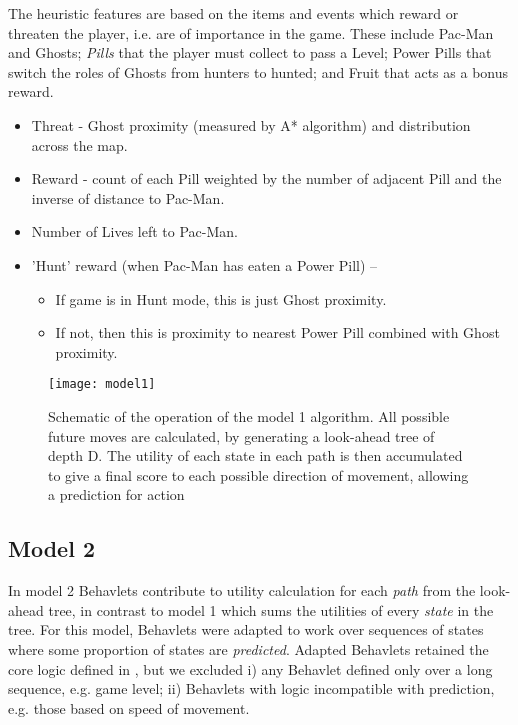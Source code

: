 \documentclass[conference]{IEEEtran}
\begin{document}
The heuristic features are based on the items and events which reward or threaten the player, i.e. are of importance in the game. These include Pac-Man and Ghosts; \textit{Pills} that the player must collect to pass a Level; Power Pills that switch the roles of Ghosts from hunters to hunted; and Fruit that acts as a bonus reward.

\begin{itemize}
	\item Threat - Ghost proximity (measured by A* algorithm) and distribution across the map.

	\item Reward - count of each Pill weighted by the number of adjacent Pill and the inverse of distance to Pac-Man.

	\item Number of Lives left to Pac-Man.

	\item 'Hunt' reward (when Pac-Man has eaten a Power Pill) –
	\begin{itemize}
		\item If game is in Hunt mode, this is just Ghost proximity.

		\item If not, then this is proximity to nearest Power Pill combined with Ghost proximity.
	\end{itemize}
\end{itemize}


\begin{figure*}[!ht]
	\centering
	\texttt{[image: model1]}
	\caption{Schematic of the operation of the model 1 algorithm. All possible future moves are calculated, by generating a look-ahead tree of depth D. The utility of each state in each path is then accumulated to give a final score to each possible direction of movement, allowing a prediction for action }
	\label{fig.model1}
\end{figure*}


\subsection{Model 2}
In model 2 Behavlets contribute to utility calculation for each \textit{path} from the look-ahead tree, in contrast to model 1 which sums the utilities of every \textit{state} in the tree. For this model, Behavlets were adapted to work over sequences of states where some proportion of states are \textit{predicted}. Adapted Behavlets retained the core logic defined in \cite{Cowley2016behavlet}, but we excluded i) any Behavlet defined only over a long sequence, e.g. game level; ii) Behavlets with logic incompatible with prediction, e.g. those based on speed of movement. 
\end{document}
